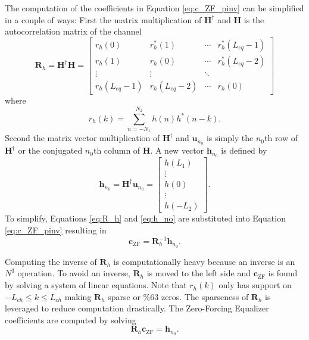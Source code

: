 The computation of the coefficients in Equation \eqref{eq:c_ZF_pinv} can be simplified in a couple of ways: First the matrix multiplication of $\mathbf{H}^\dagger$ and $\mathbf{H}$ is the autocorrelation matrix of the channel
\begin{equation}
\mathbf{R}_{h} = 
\mathbf{H}^\dagger \mathbf{H} = 
		\begin{bmatrix}
		r_{h}(0)		& r^\ast_{h}(1)	& \cdots 	& r^\ast_{h}(L_{eq}-1)  	\\
		r_{h}(1) 		& r_{h}(0)		& \cdots 	& r^\ast_{h}(L_{eq}-2)  	\\
		\vdots	 			& \vdots				& \ddots 	&  							\\
		r_{h}(L_{eq}-1)	& r_{h}(L_{eq}-2)	& \cdots	& r_{h}(0)  			
	\end{bmatrix}
	\label{eq:R_h}
\end{equation}
where
\begin{equation}
r_{h}(k) = \sum_{n=-N_1}^{N_2} h(n) h^\ast(n-k).
\end{equation}
Second the matrix vector multiplication of $\mathbf{H}^\dagger$ and $\mathbf{u}_{n_0}$ is simply the $n_0$th row of $\mathbf{H}^\dagger$ or the conjugated $n_0$th column of $\mathbf{H}$.
A new vector $\mathbf{h}_{n_0}$ is defined by
\begin{equation}
\mathbf{h}_{n_0} = \mathbf{H}^\dagger \mathbf{u}_{n_0} = 
\begin{bmatrix} h(L_1) \\ \vdots \\ h(0) \\ \vdots \\ h(-L_2)  \end{bmatrix}.
\label{eq:h_no}
\end{equation}
To simplify, Equations \eqref{eq:R_h} and \eqref{eq:h_no} are substituted into Equation \eqref{eq:c_ZF_pinv} resulting in 
\begin{equation}
\mathbf{c}_\text{ZF} = \mathbf{R}^{-1}_{h} \mathbf{h}_{n_0}.
\label{eq:c_ZF_R_h}
\end{equation}

Computing the inverse of $\mathbf{R}_{h}$ is computationally heavy because an inverse is an $N^3$ operation.
To avoid an inverse, $\mathbf{R}_{h}$ is moved to the left side and $\mathbf{c}_\text{ZF}$ is found by solving a system of linear equations. 
Note that $r_{h}(k)$ only has support on $-L_{ch} \leq k \leq L_{ch}$ making $\mathbf{R}_{h}$ sparse or $\%63$ zeros.
The sparseness of $\mathbf{R}_{h}$ is leveraged to reduce computation drastically.
The Zero-Forcing Equalizer coefficients are computed by solving
\begin{equation}
\mathbf{R}_h \mathbf{c}_\text{ZF} = \mathbf{h}_{n_0}.
\label{eq:c_ZF_solve}
\end{equation}


